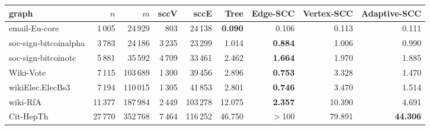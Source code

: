 \begin{tabular}{lrrrr|rrrr}
\toprule
graph & $n$ & $m$ & sccV & sccE & Tree & Edge-SCC & Vertex-SCC & Adaptive-SCC \\
\midrule
email-Eu-core & 1\,005 & 24\,929 & 803 & 24\,138 & \textbf{0.090} & 0.106 & 0.113 & 0.111 \\
soc-sign-bitcoinalpha & 3\,783 & 24\,186 & 3\,235 & 23\,299 & 1.014 & \textbf{0.884} & 1.006 & 0.990 \\
soc-sign-bitcoinotc & 5\,881 & 35\,592 & 4\,709 & 33\,461 & 2.462 & \textbf{1.664} & 1.970 & 1.885 \\
Wiki-Vote & 7\,115 & 103\,689 & 1\,300 & 39\,456 & 2.896 & \textbf{0.753} & 3.328 & 1.470 \\
wikiElec.ElecBs3 & 7\,194 & 110\,015 & 1\,305 & 41\,853 & 2.801 & \textbf{0.746} & 3.470 & 1.514 \\
wiki-RfA & 11\,377 & 187\,984 & 2\,449 & 103\,278 & 12.075 & \textbf{2.357} & 10.390 & 4.691 \\
Cit-HepTh & 27\,770 & 352\,768 & 7\,464 & 116\,252 & 46.750 & $>$100 & 79.891 & \textbf{44.306} \\
\bottomrule
\end{tabular}
